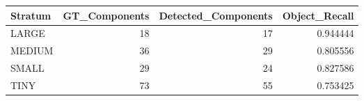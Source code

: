 \begin{tabular}{lrrr}
\toprule
Stratum & GT_Components & Detected_Components & Object_Recall \\
\midrule
LARGE & 18 & 17 & 0.944444 \\
MEDIUM & 36 & 29 & 0.805556 \\
SMALL & 29 & 24 & 0.827586 \\
TINY & 73 & 55 & 0.753425 \\
\bottomrule
\end{tabular}
